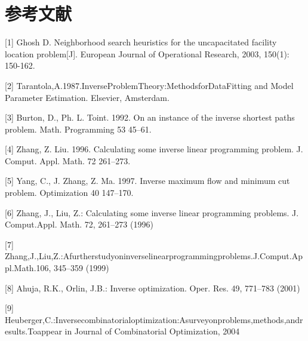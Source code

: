 \documentclass[UTF8]{article}
\begin{document}

\section*{参考文献}

[1] Ghosh D. Neighborhood search heuristics for the uncapacitated facility location problem[J]. European Journal of Operational Research, 2003, 150(1): 150-162.

[2] Tarantola,A.1987.InverseProblemTheory:MethodsforDataFitting and Model Parameter Estimation. Elsevier, Amsterdam.

[3] Burton, D., Ph. L. Toint. 1992. On an instance of the inverse shortest paths problem. Math. Programming 53 45–61.

[4] Zhang, Z. Liu. 1996. Calculating some inverse linear programming problem. J. Comput. Appl. Math. 72 261–273.

[5] Yang, C., J. Zhang, Z. Ma. 1997. Inverse maximum ﬂow and minimum cut problem. Optimization 40 147–170.

[6] Zhang, J., Liu, Z.: Calculating some inverse linear programming problems. J. Comput.Appl. Math. 72, 261–273 (1996)

[7] Zhang,J.,Liu,Z.:Afurtherstudyoninverselinearprogrammingproblems.J.Comput.Appl.Math.106, 345–359 (1999)

[8] Ahuja, R.K., Orlin, J.B.: Inverse optimization. Oper. Res. 49, 771–783 (2001)

[9] Heuberger,C.:Inversecombinatorialoptimization:Asurveyonproblems,methods,andresults.Toappear in Journal of Combinatorial Optimization, 2004
\end{document}

